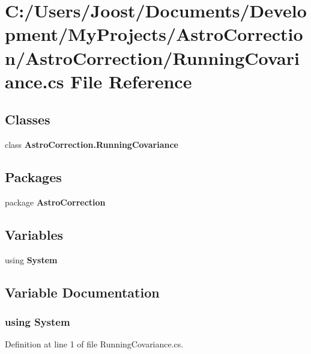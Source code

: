\section{C:/Users/Joost/Documents/Development/MyProjects/AstroCorrection/AstroCorrection/RunningCovariance.cs File Reference}
\label{_running_covariance_8cs}
\subsection*{Classes}
\begin{DoxyCompactItemize}
\item 
class {\bf AstroCorrection.RunningCovariance}
\end{DoxyCompactItemize}
\subsection*{Packages}
\begin{DoxyCompactItemize}
\item 
package {\bf AstroCorrection}
\end{DoxyCompactItemize}
\subsection*{Variables}
\begin{DoxyCompactItemize}
\item 
﻿using {\bf System}
\end{DoxyCompactItemize}


\subsection{Variable Documentation}
\subsubsection[{System}]{\setlength{\rightskip}{0pt plus 5cm}﻿using {\bf System}}\label{_running_covariance_8cs_a81a223a02c34d82b47199f08308847f2}


Definition at line 1 of file RunningCovariance.cs.